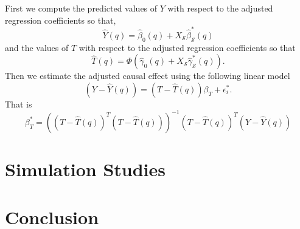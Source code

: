 \documentclass[oribibl]{llncs}
\begin{document}
First we compute the predicted values of $Y$ with respect to
the adjusted regression coefficients so that,
\begin{equation}
	\hat{Y}(q) 
	= \hat{\beta}_0(q) + X_{\mathcal{S}}\hat{\beta}^*_{\mathcal{S}}(q)
\end{equation}
and the values of $T$ with respect to the adjusted
regression coefficients so that
\begin{equation}
	\hat{T}(q) 
	= \Phi\left(\hat{\gamma}_0(q) + X_{\mathcal{S}}\hat{\gamma}^*_{\mathcal{S}}(q)\right).
\end{equation}
Then we estimate the adjusted causal effect using the following linear
model
\begin{equation}
	\left(Y-\hat{Y}(q)\right) = \left(T - \hat{T}(q)\right)\beta_{T} + \epsilon^*_i.
\end{equation}
That is 
\begin{equation}
	\beta_{T}^* = \left(\left(T - \hat{T}(q)\right)^T\left(T - \hat{T}(q)\right)\right)^{-1}\left(T - \hat{T}(q)\right)^T\left(Y-\hat{Y}(q)\right)
\end{equation}

\fi


\section{Simulation Studies}\label{sec:sim}


\section{Conclusion}\label{sec:conc}



\end{document}
